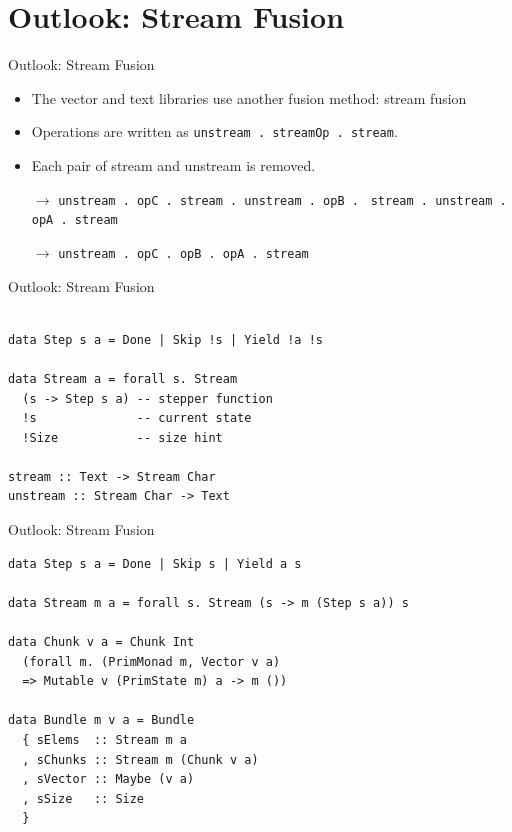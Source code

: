 \documentclass[11pt]{beamer}
\begin{document}
%



\section{Outlook: Stream Fusion}

\begin{frame}[fragile]{Outlook: Stream Fusion}
	\begin{itemize}
		\item The vector and text libraries use another fusion method: stream fusion
		\item Operations are written as \texttt{unstream . streamOp . stream}.
		\item Each pair of stream and unstream is removed.
		\item[$\rightarrow$] \texttt{unstream . opC . stream . unstream . opB . }
			\texttt{stream . unstream . opA . stream}
		\item[$\rightarrow$] \texttt{unstream . opC . opB . opA . stream}
	\end{itemize}
\end{frame}

\begin{frame}[fragile]{Outlook: Stream Fusion}
\begin{verbatim}

data Step s a = Done | Skip !s | Yield !a !s

data Stream a = forall s. Stream
  (s -> Step s a) -- stepper function
  !s              -- current state
  !Size           -- size hint

stream :: Text -> Stream Char
unstream :: Stream Char -> Text
\end{verbatim}
\end{frame}

\begin{frame}[fragile]{Outlook: Stream Fusion}
\begin{verbatim}
data Step s a = Done | Skip s | Yield a s

data Stream m a = forall s. Stream (s -> m (Step s a)) s

data Chunk v a = Chunk Int
  (forall m. (PrimMonad m, Vector v a)
  => Mutable v (PrimState m) a -> m ())

data Bundle m v a = Bundle
  { sElems  :: Stream m a
  , sChunks :: Stream m (Chunk v a)
  , sVector :: Maybe (v a)
  , sSize   :: Size
  }
\end{verbatim}
\end{frame}
\end{document}
